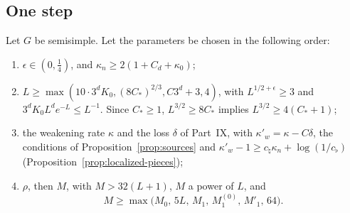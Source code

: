 \subsection{One step}\label{subsec:flow-step}

\begin{theorem}\label{thm:one-step}
Let $G$ be semisimple. Let the parameters be chosen in the following order:
\begin{enumerate}[label=(\arabic*)]
\item $\epsilon\in(0,\frac14)$, and $\kappa_n\ge2(1+C_d+\kappa_0)$;
\item $L\ge\max(10\cdot3^dK_0,(8C_*)^{2/3},C3^d+3,4)$, with $L^{1/2+\epsilon}\ge3$ and $3^dK_0L^de^{-L}\le L^{-1}$. Since $C_*\ge1$, $L^{3/2}\ge8C_*$ implies $L^{3/2}\ge4(C_*+1)$;
\item the weakening rate $\kappa$ and the loss $\delta$ of Part~IX, with $\kappa'_w=\kappa-C\delta$, the conditions of Proposition~\ref{prop:sources} and $\kappa'_w-1\ge c_\natural\kappa_n+\log(1/c_\flat)$ (Proposition~\ref{prop:localized-pieces});
\item $\rho$, then $M$, with $M>32(L+1)$, $M$ a power of $L$, and
\[
M\ge\max\big(M_0,\,5L,\,M_1,\,M_1^{(0)},\,M'_1,\,64\big).
\]

\end{enumerate}
\end{theorem}
